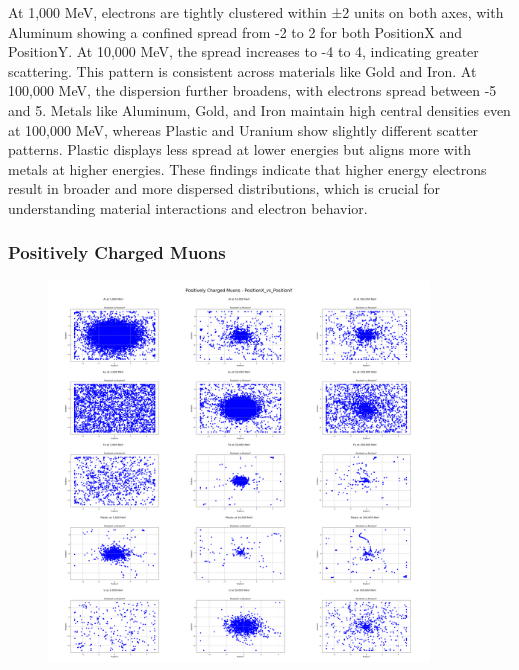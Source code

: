 \documentclass{article}
\begin{document}
\noindent At 1,000 MeV, electrons are tightly clustered within ±2 units on both axes, with Aluminum showing a confined spread from -2 to 2 for both PositionX and PositionY. At 10,000 MeV, the spread increases to -4 to 4, indicating greater scattering. This pattern is consistent across materials like Gold and Iron. At 100,000 MeV, the dispersion further broadens, with electrons spread between -5 and 5. Metals like Aluminum, Gold, and Iron maintain high central densities even at 100,000 MeV, whereas Plastic and Uranium show slightly different scatter patterns. Plastic displays less spread at lower energies but aligns more with metals at higher energies. These findings indicate that higher energy electrons result in broader and more dispersed distributions, which is crucial for understanding material interactions and electron behavior.

\subsubsection{Positively Charged Muons}

\begin{figure}[H]
\centering
\includegraphics[width=0.9\textwidth]{images/Combined Plots/PositionX_vs_PositionY_mu+.png}
\end{figure}\
\end{document}
